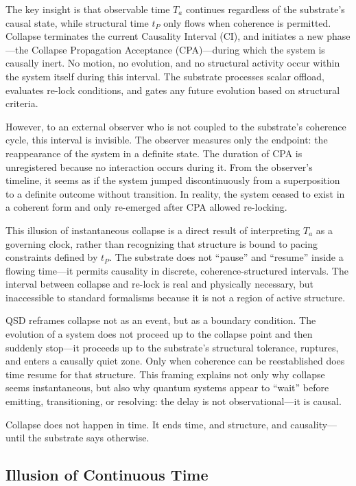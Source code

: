 \documentclass[preprints,article,submit,pdftex,moreauthors]{Definitions/mdpi}
\begin{document}
The key insight is that observable time \(T_a\) continues regardless of the substrate's causal state, while structural time \(t_P\) only flows when coherence is permitted. Collapse terminates the current Causality Interval (CI), and initiates a new phase—the Collapse Propagation Acceptance (CPA)—during which the system is causally inert. No motion, no evolution, and no structural activity occur within the system itself during this interval. The substrate processes scalar offload, evaluates re-lock conditions, and gates any future evolution based on structural criteria.

However, to an external observer who is not coupled to the substrate's coherence cycle, this interval is invisible. The observer measures only the endpoint: the reappearance of the system in a definite state. The duration of CPA is unregistered because no interaction occurs during it. From the observer’s timeline, it seems as if the system jumped discontinuously from a superposition to a definite outcome without transition. In reality, the system ceased to exist in a coherent form and only re-emerged after CPA allowed re-locking.

This illusion of instantaneous collapse is a direct result of interpreting \(T_a\) as a governing clock, rather than recognizing that structure is bound to pacing constraints defined by \(t_P\). The substrate does not “pause” and “resume” inside a flowing time—it permits causality in discrete, coherence-structured intervals. The interval between collapse and re-lock is real and physically necessary, but inaccessible to standard formalisms because it is not a region of active structure.

QSD reframes collapse not as an event, but as a boundary condition. The evolution of a system does not proceed up to the collapse point and then suddenly stop—it proceeds up to the substrate’s structural tolerance, ruptures, and enters a causally quiet zone. Only when coherence can be reestablished does time resume for that structure. This framing explains not only why collapse seems instantaneous, but also why quantum systems appear to “wait” before emitting, transitioning, or resolving: the delay is not observational—it is causal.

Collapse does not happen in time. It ends time, and structure, and causality—until the substrate says otherwise.

\subsection{Illusion of Continuous Time}
\end{document}

